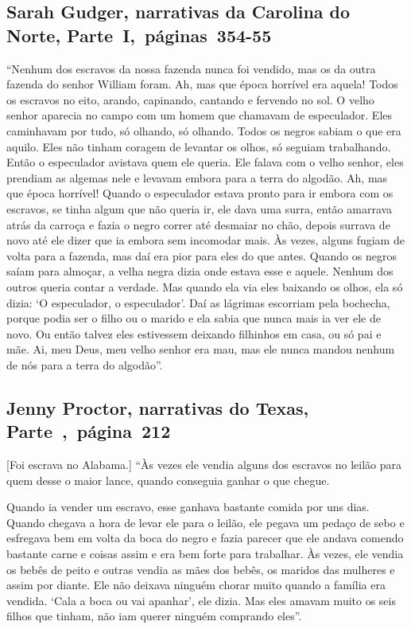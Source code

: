 \subsection{Sarah Gudger, narrativas da Carolina do Norte, Parte~I,~páginas~354-55}
\label{ref115}

``Nenhum dos escravos da nossa fazenda nunca foi vendido, mas os da
outra fazenda do senhor William foram. Ah, mas que época horrível era
aquela! Todos os escravos no eito, arando, capinando, cantando e
fervendo no sol. O velho senhor aparecia no campo com um homem que
chamavam de especulador. Eles caminhavam por tudo, só olhando, só
olhando. Todos os negros sabiam o que era aquilo. Eles não tinham
coragem de levantar os olhos, só seguiam trabalhando. Então o
especulador avistava quem ele queria. Ele falava com o velho senhor,
eles prendiam as algemas nele e levavam embora para a terra do algodão.
Ah, mas que época horrível! Quando o especulador estava pronto para ir
embora com os escravos, se tinha algum que não queria ir, ele dava uma
surra, então amarrava atrás da carroça e fazia o negro correr até
desmaiar no chão, depois surrava de novo até ele dizer que ia embora sem
incomodar mais. Às vezes, alguns fugiam de volta para a fazenda, mas daí
era pior para eles do que antes. Quando os negros saíam para almoçar, a
velha negra dizia onde estava esse e aquele. Nenhum dos outros queria
contar a verdade. Mas quando ela via eles baixando os olhos, ela só
dizia: `O especulador, o especulador'. Daí as lágrimas escorriam pela
bochecha, porque podia ser o filho ou o marido e ela sabia que nunca
mais ia ver ele de novo. Ou então talvez eles estivessem deixando
filhinhos em casa, ou só pai e mãe. Ai, meu Deus, meu velho senhor era
mau, mas ele nunca mandou nenhum de nós para a terra do algodão''.

\subsection{Jenny Proctor, narrativas do Texas, Parte~,~página~212}
\label{ref218}

{[}Foi escrava no Alabama.{]} ``Às vezes ele vendia alguns dos escravos no leilão para quem desse o
maior lance, quando conseguia ganhar o que chegue. %

Quando ia vender um escravo, esse ganhava bastante comida por uns dias.
Quando chegava a hora de levar ele para o leilão, ele pegava um pedaço
de sebo e esfregava bem em volta da boca do negro e fazia parecer que
ele andava comendo bastante carne e coisas assim e era bem forte para
trabalhar. Às vezes, ele vendia os bebês de peito e outras vendia as
mães dos bebês, os maridos das mulheres e assim por diante. Ele não
deixava ninguém chorar muito quando a família era vendida. `Cala a boca
ou vai apanhar', ele dizia. Mas eles amavam muito os seis filhos que
tinham, não iam querer ninguém comprando eles''.

